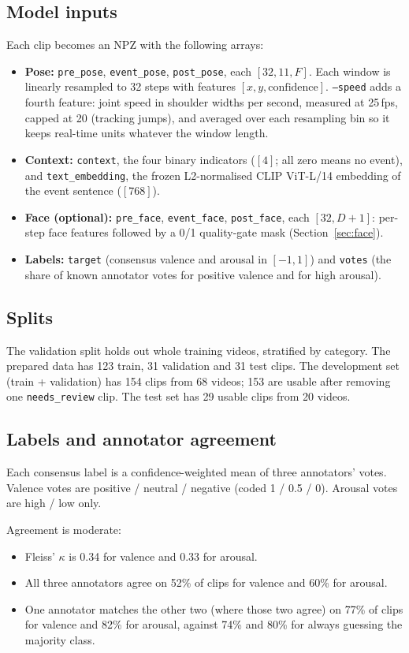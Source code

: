 \documentclass[11pt]{article}
\newcommand{\code}[1]{\texttt{#1}}
\begin{document}
\subsection{Model inputs}
Each clip becomes an NPZ with the following arrays:
\begin{itemize}
  \item \textbf{Pose:} \code{pre\_pose}, \code{event\_pose}, \code{post\_pose}, each $[32, 11, F]$. Each window is linearly resampled to 32 steps with features $[x, y, \text{confidence}]$. \code{--speed} adds a fourth feature: joint speed in shoulder widths per second, measured at 25\,fps, capped at 20 (tracking jumps), and averaged over each resampling bin so it keeps real-time units whatever the window length.
  \item \textbf{Context:} \code{context}, the four binary indicators ($[4]$; all zero means no event), and \code{text\_embedding}, the frozen L2-normalised CLIP ViT-L/14 embedding of the event sentence ($[768]$).
  \item \textbf{Face (optional):} \code{pre\_face}, \code{event\_face}, \code{post\_face}, each $[32, D{+}1]$: per-step face features followed by a 0/1 quality-gate mask (Section~\ref{sec:face}).
  \item \textbf{Labels:} \code{target} (consensus valence and arousal in $[-1,1]$) and \code{votes} (the share of known annotator votes for positive valence and for high arousal).
\end{itemize}

\subsection{Splits}
The validation split holds out whole training videos, stratified by category. The prepared data has 123 train, 31 validation and 31 test clips. The development set (train + validation) has 154 clips from 68 videos; 153 are usable after removing one \code{needs\_review} clip. The test set has 29 usable clips from 20 videos.

\subsection{Labels and annotator agreement}
Each consensus label is a confidence-weighted mean of three annotators' votes. Valence votes are positive / neutral / negative (coded 1 / 0.5 / 0). Arousal votes are high / low only.

Agreement is moderate:
\begin{itemize}
  \item Fleiss' $\kappa$ is 0.34 for valence and 0.33 for arousal.
  \item All three annotators agree on 52\% of clips for valence and 60\% for arousal.
  \item One annotator matches the other two (where those two agree) on 77\% of clips for valence and 82\% for arousal, against 74\% and 80\% for always guessing the majority class.
\end{itemize}
\end{document}
